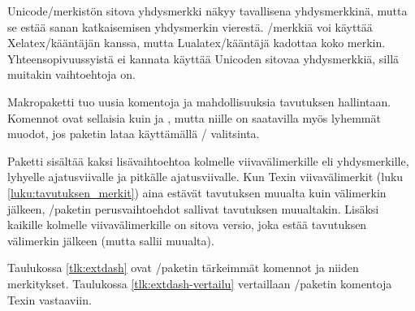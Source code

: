 Unicode\-/merkistön sitova yhdysmerkki  näkyy tavallisena yhdysmerkkinä, mutta se estää sanan
katkaisemisen yhdysmerkin vierestä. \-/merkkiä voi
käyttää Xelatex\-/kääntäjän kanssa, mutta Lualatex\-/kääntäjä kadottaa
koko merkin. Yhteensopivuussyistä ei kannata käyttää Unicoden sitovaa
yhdysmerkkiä, sillä muitakin vaihtoehtoja on.

Makropaketti  tuo uusia komentoja ja
mahdollisuuksia tavutuksen hallintaan. Komennot ovat sellaisia kuin
 ja , mutta niille on saatavilla myös
lyhemmät muodot, jos paketin lataa käyttämällä \-/
valitsinta.

\begin{koodilohkosis}
  \usepackage[shortcuts]{extdash}
\end{koodilohkosis}

Paketti sisältää kaksi lisävaihtoehtoa kolmelle viivavälimerkille
eli yhdysmerkille, lyhyelle ajatusviivalle ja pitkälle ajatusviivalle.
Kun Texin viivavälimerkit (luku \ref{luku:tavutuksen_merkit}) aina
estävät tavutuksen muualta kuin välimerkin jälkeen,
\-/paketin perusvaihtoehdot sallivat tavutuksen
muualtakin. Lisäksi kaikille kolmelle viivavälimerkille on sitova
versio, joka estää tavutuksen välimerkin jälkeen (mutta sallii muualta).

Taulukossa \ref{tlk:extdash} ovat \-/paketin tärkeimmät
komennot ja niiden merkitykset. Taulukossa \ref{tlk:extdash-vertailu}
vertaillaan \-/paketin komentoja Texin vastaaviin.


